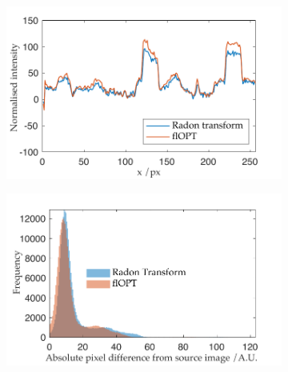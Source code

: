 \documentclass[times, twoside, watermark]{zHenriquesLab-StyleBioRxiv}
\begin{document}
\begin{figure}
  \centering
  \begin{subfigure}[t]{0.45\linewidth}
    \centering
    \includegraphics[width=\linewidth]{./figures/results/comparison_line_profile}
    \caption{}\label{fig:flopt_comparison_line_profile}
  \end{subfigure}\quad
 \begin{subfigure}[t]{0.45\linewidth}
    \centering
    \includegraphics[width=\linewidth]{./figures/results/flopt_histogram}

\end{subfigure}
\end{figure}
\end{document}
